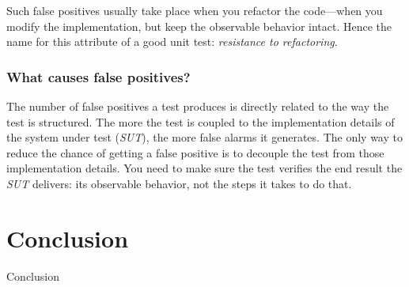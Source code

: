 \documentclass{article}
\begin{document}
Such false positives usually take place when you refactor the code—when you modify the implementation, but keep the observable behavior intact. Hence the name for this attribute of a good unit test: \textit{resistance to refactoring}.


\subsubsection{What causes false positives?}
The number of false positives a test produces is directly related to the way the test is structured. The more the test is coupled to the implementation details of the system under test (\textit{SUT}), the more false alarms it generates. The only way to reduce the chance of getting a false positive is to decouple the test from those implementation details. You need to make sure the test verifies the end result the \textit{SUT} delivers: its observable behavior, not the steps it takes to do that. 

\section{Conclusion}

Conclusion


\newpage

 

\end{document}
